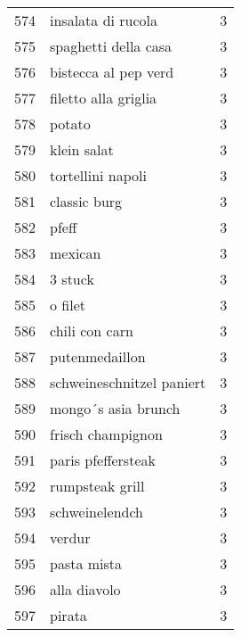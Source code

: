 \begin{tabular}{llr}
574  &                                 insalata di rucola &      3 \\
575  &                               spaghetti della casa &      3 \\
576  &                               bistecca al pep verd &      3 \\
577  &                               filetto alla griglia &      3 \\
578  &                                             potato &      3 \\
579  &                                        klein salat &      3 \\
580  &                                  tortellini napoli &      3 \\
581  &                                       classic burg &      3 \\
582  &                                              pfeff &      3 \\
583  &                                            mexican &      3 \\
584  &                                            3 stuck &      3 \\
585  &                                            o filet &      3 \\
586  &                                     chili con carn &      3 \\
587  &                                     putenmedaillon &      3 \\
588  &                          schweineschnitzel paniert &      3 \\
589  &                                mongo´s asia brunch &      3 \\
590  &                                  frisch champignon &      3 \\
591  &                                 paris pfeffersteak &      3 \\
592  &                                    rumpsteak grill &      3 \\
593  &                                     schweinelendch &      3 \\
594  &                                             verdur &      3 \\
595  &                                        pasta mista &      3 \\
596  &                                       alla diavolo &      3 \\
597  &                                             pirata &      3 \\

\end{tabular}
